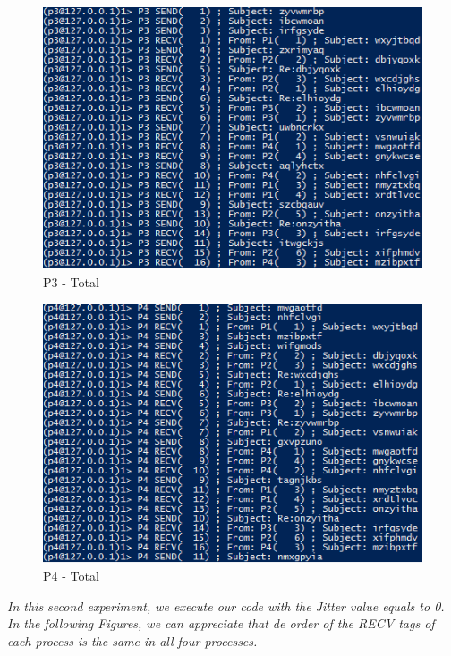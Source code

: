\begin{figure}[h!]
\centering
\includegraphics[scale=0.9]{sections/screenshots/totalP3.png}
\caption{P3 - Total}
\label{fig:p3_Total}
\end{figure}

\begin{figure}[h!]
\centering
\includegraphics[scale=0.9]{sections/screenshots/totalP4.png}
\caption{P4 - Total}
\label{fig:p4_Total}
\end{figure}

\clearpage
\textit{In this second experiment, we execute our code with the Jitter value equals to 0. In the following Figures, we can appreciate that de order of the RECV tags of each process is the same in all four processes.}

